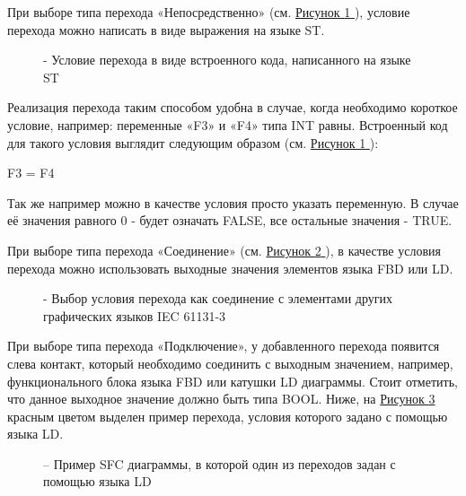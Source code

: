 \documentclass[letterpaper,10pt,russian]{sphinxmanual}
\begin{document}
При выборе типа перехода «Непосредственно» (см. \hyperref[usage_guide/ide_components:image96]{Рисунок \ref{usage_guide/ide_components:image96} }), условие
перехода можно написать в виде выражения на языке ST.
\begin{figure}[htbp]
\centering
\capstart

\noindent{}
\caption{- Условие перехода в виде встроенного кода, написанного на языке ST}\label{usage_guide/ide_components:image96}\end{figure}

Реализация перехода таким способом удобна в случае, когда необходимо
короткое условие, например: переменные «F3» и «F4» типа INT равны.
Встроенный код для такого условия выглядит следующим образом (см. \hyperref[usage_guide/ide_components:image96]{Рисунок \ref{usage_guide/ide_components:image96} }):

F3 = F4

Так же например можно в качестве условия просто указать переменную. В
случае её значения равного 0 - будет означать FALSE, все остальные
значения - TRUE.

При выборе типа перехода «Соединение» (см. \hyperref[usage_guide/ide_components:image97]{Рисунок \ref{usage_guide/ide_components:image97} }), в качестве условия
перехода можно использовать выходные значения элементов языка FBD или
LD.
\begin{figure}[htbp]
\centering
\capstart

\noindent{}
\caption{- Выбор условия перехода как соединение с элементами других графических языков IEC 61131-3}\label{usage_guide/ide_components:image97}\end{figure}

При выборе типа перехода «Подключение», у добавленного перехода появится
слева контакт, который необходимо соединить с выходным значением,
например, функционального блока языка FBD или катушки LD диаграммы.
Стоит отметить, что данное выходное значение должно быть типа BOOL.
Ниже, на \hyperref[usage_guide/ide_components:image98]{Рисунок \ref{usage_guide/ide_components:image98} } красным цветом выделен пример перехода, условия
которого задано с помощью языка LD.
\begin{figure}[htbp]
\centering
\capstart

\noindent{}
\caption{– Пример SFC диаграммы, в которой один из переходов задан с помощью языка LD}\label{usage_guide/ide_components:image98}\end{figure}
\end{document}
